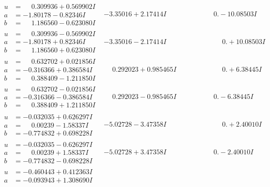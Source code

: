\documentclass[1p]{elsarticle_modified}
\theoremstyle{definition}
\begin{document}
$$\begin{array}{c|c|c}
\begin{aligned}
u &= \phantom{-}0.309936 + 0.569902 I \\
a &= -1.80178 - 0.82346 I \\
b &= \phantom{-}1.186560 - 0.623080 I\end{aligned}
 & -3.35016 + 2.17414 I & \phantom{-0.000000 } 0. - 10.08503 I \\ \hline\begin{aligned}
u &= \phantom{-}0.309936 - 0.569902 I \\
a &= -1.80178 + 0.82346 I \\
b &= \phantom{-}1.186560 + 0.623080 I\end{aligned}
 & -3.35016 - 2.17414 I & \phantom{-0.000000 -}0. + 10.08503 I \\ \hline\begin{aligned}
u &= \phantom{-}0.632702 + 0.021856 I \\
a &= -0.316366 + 0.386584 I \\
b &= \phantom{-}0.388409 - 1.211850 I\end{aligned}
 & \phantom{-}0.292023 + 0.985465 I & \phantom{-0.000000 -}0. + 6.38445 I \\ \hline\begin{aligned}
u &= \phantom{-}0.632702 - 0.021856 I \\
a &= -0.316366 - 0.386584 I \\
b &= \phantom{-}0.388409 + 1.211850 I\end{aligned}
 & \phantom{-}0.292023 - 0.985465 I & \phantom{-0.000000 } 0. - 6.38445 I \\ \hline\begin{aligned}
u &= -0.032035 + 0.626297 I \\
a &= \phantom{-}0.00239 - 1.58337 I \\
b &= -0.774832 + 0.698228 I\end{aligned}
 & -5.02728 - 3.47358 I & \phantom{-0.000000 -}0. + 2.40010 I \\ \hline\begin{aligned}
u &= -0.032035 - 0.626297 I \\
a &= \phantom{-}0.00239 + 1.58337 I \\
b &= -0.774832 - 0.698228 I\end{aligned}
 & -5.02728 + 3.47358 I & \phantom{-0.000000 } 0. - 2.40010 I \\ \hline\begin{aligned}
u &= -0.460443 + 0.412363 I \\
a &= -0.093943 + 1.308690 I \\

\end{aligned}
\end{array}$$
\end{document}
